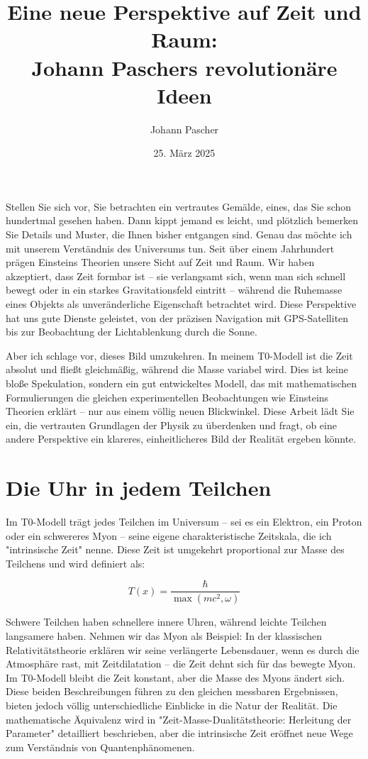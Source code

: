 \documentclass[a4paper,12pt]{article}
\title{Eine neue Perspektive auf Zeit und Raum: \\Johann Paschers revolutionäre Ideen}
\author{Johann Pascher}
\date{25. März 2025}
\newcommand{\Tfield}{T(x)}
\begin{document}
	
	\maketitle
	
	Stellen Sie sich vor, Sie betrachten ein vertrautes Gemälde, eines, das Sie schon hundertmal gesehen haben. Dann kippt jemand es leicht, und plötzlich bemerken Sie Details und Muster, die Ihnen bisher entgangen sind. Genau das möchte ich mit unserem Verständnis des Universums tun. Seit über einem Jahrhundert prägen Einsteins Theorien unsere Sicht auf Zeit und Raum. Wir haben akzeptiert, dass Zeit formbar ist – sie verlangsamt sich, wenn man sich schnell bewegt oder in ein starkes Gravitationsfeld eintritt – während die Ruhemasse eines Objekts als unveränderliche Eigenschaft betrachtet wird. Diese Perspektive hat uns gute Dienste geleistet, von der präzisen Navigation mit GPS-Satelliten bis zur Beobachtung der Lichtablenkung durch die Sonne.
	
	Aber ich schlage vor, dieses Bild umzukehren. In meinem T0-Modell ist die Zeit absolut und fließt gleichmäßig, während die Masse variabel wird. Dies ist keine bloße Spekulation, sondern ein gut entwickeltes Modell, das mit mathematischen Formulierungen die gleichen experimentellen Beobachtungen wie Einsteins Theorien erklärt – nur aus einem völlig neuen Blickwinkel. Diese Arbeit lädt Sie ein, die vertrauten Grundlagen der Physik zu überdenken und fragt, ob eine andere Perspektive ein klareres, einheitlicheres Bild der Realität ergeben könnte.
	
	\section{Die Uhr in jedem Teilchen}
	
	Im T0-Modell trägt jedes Teilchen im Universum – sei es ein Elektron, ein Proton oder ein schwereres Myon – seine eigene charakteristische Zeitskala, die ich "intrinsische Zeit" nenne. Diese Zeit ist umgekehrt proportional zur Masse des Teilchens und wird definiert als:
	
	\begin{equation}
		\Tfield = \frac{\hbar}{\max(m c^2, \omega)}
	\end{equation}
	
	Schwere Teilchen haben schnellere innere Uhren, während leichte Teilchen langsamere haben. Nehmen wir das Myon als Beispiel: In der klassischen Relativitätstheorie erklären wir seine verlängerte Lebensdauer, wenn es durch die Atmosphäre rast, mit Zeitdilatation – die Zeit dehnt sich für das bewegte Myon. Im T0-Modell bleibt die Zeit konstant, aber die Masse des Myons ändert sich. Diese beiden Beschreibungen führen zu den gleichen messbaren Ergebnissen, bieten jedoch völlig unterschiedliche Einblicke in die Natur der Realität. Die mathematische Äquivalenz wird in "Zeit-Masse-Dualitätstheorie: Herleitung der Parameter" \cite{pascher_params_2025} detailliert beschrieben, aber die intrinsische Zeit eröffnet neue Wege zum Verständnis von Quantenphänomenen.
	
\end{document}
